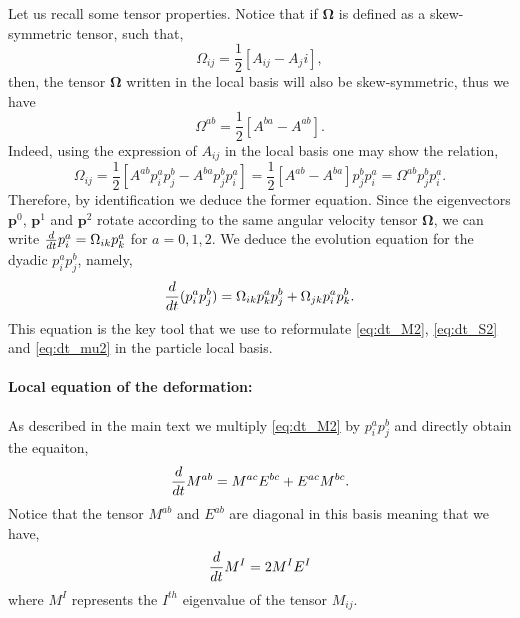 Let us recall some tensor properties. 
Notice that if $\bm{\Omega}$ is defined as a skew-symmetric tensor, such that, 
\begin{equation}
    \Omega_{ij} = \frac{1}{2} [A_{ij}-A_ji],
\end{equation}
then, the tensor $\bm\Omega$ written in the local basis will also be skew-symmetric, thus we have
\begin{equation}
    \Omega^{ab} = \frac{1}{2} [A^{ba}-A^{ab}]. 
\end{equation}
Indeed, using the expression of $A_{ij}$ in the local basis one may show the relation, 
\begin{equation}
    \Omega_{ij} = \frac{1}{2} [A^{ab} p^a_i p^b_j-A^{ba} p^b_j p^a_i]
    =  \frac{1}{2} [A^{ab} - A^{ba} ]p^b_j p^a_i
    =  \Omega^{ab} p^b_j p^a_i. 
\end{equation}
Therefore, by identification we deduce the former equation. 
Since the eigenvectors $\textbf{p}^0$, $\textbf{p}^1$ and  $\textbf{p}^2$ rotate according to the same angular velocity tensor $\bm\Omega$, we can write $\frac{d}{dt} p_i^a =\Omega_{ik} p_k^a$ for $a =0,1,2$. 
We deduce the evolution equation for the dyadic $p_i^ap_j^b$, namely,
\begin{equation*}
    \frac{d}{dt}(p_i^ap_j^b)
    = 
    \Omega_{ik} p_k^ap_j^b
    + \Omega_{jk} p_i^ap_k^b.
    \label{eq:orientation_pp}
\end{equation*}
This equation is the key tool that we use to reformulate \ref{eq:dt_M2}, \ref{eq:dt_S2} and \ref{eq:dt_mu2} in the particle local basis. 

\paragraph*{Local equation of the deformation:}
As described in the main text we multiply \ref{eq:dt_M2} by $p_i^ap_j^b$ and directly obtain the equaiton, 
\begin{equation*}
    \frac{d}{dt} M^{ab}
    = 
    M^{ac} E^{bc} 
    + E^{ac} M^{bc}. 
\end{equation*}
Notice that the tensor $M^{ab}$ and $E^{ab}$ are diagonal in this basis meaning that we have, 
\begin{equation*}
    \frac{d}{dt} M^I
    = 
    2 M^I E^I
\end{equation*}
where $M^I$ represents the $I^{th}$ eigenvalue of the tensor $M_{ij}$. 

